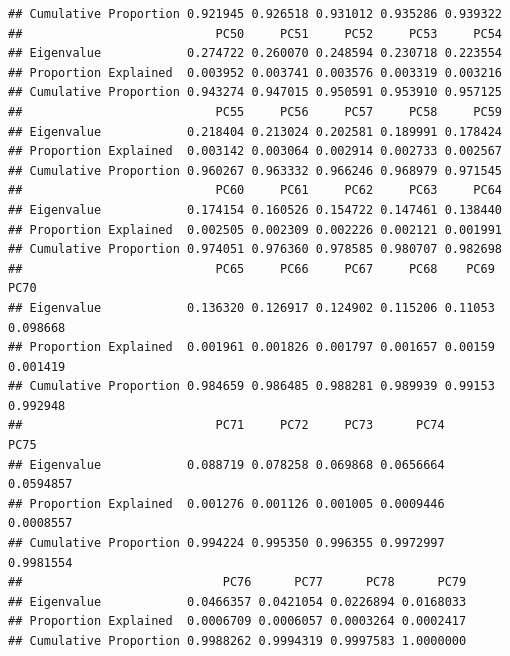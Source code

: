 \documentclass[]{article}
\newenvironment{Shaded}{\begin{snugshade}}{\end{snugshade}}
\newcommand{\CommentTok}[1]{\textcolor[rgb]{0.56,0.35,0.01}{\textit{#1}}}
\newcommand{\DataTypeTok}[1]{\textcolor[rgb]{0.13,0.29,0.53}{#1}}
\newcommand{\KeywordTok}[1]{\textcolor[rgb]{0.13,0.29,0.53}{\textbf{#1}}}
\newcommand{\NormalTok}[1]{#1}
\newcommand{\OperatorTok}[1]{\textcolor[rgb]{0.81,0.36,0.00}{\textbf{#1}}}
\newcommand{\StringTok}[1]{\textcolor[rgb]{0.31,0.60,0.02}{#1}}
\begin{document}
\begin{verbatim}
## Cumulative Proportion 0.921945 0.926518 0.931012 0.935286 0.939322
##                           PC50     PC51     PC52     PC53     PC54
## Eigenvalue            0.274722 0.260070 0.248594 0.230718 0.223554
## Proportion Explained  0.003952 0.003741 0.003576 0.003319 0.003216
## Cumulative Proportion 0.943274 0.947015 0.950591 0.953910 0.957125
##                           PC55     PC56     PC57     PC58     PC59
## Eigenvalue            0.218404 0.213024 0.202581 0.189991 0.178424
## Proportion Explained  0.003142 0.003064 0.002914 0.002733 0.002567
## Cumulative Proportion 0.960267 0.963332 0.966246 0.968979 0.971545
##                           PC60     PC61     PC62     PC63     PC64
## Eigenvalue            0.174154 0.160526 0.154722 0.147461 0.138440
## Proportion Explained  0.002505 0.002309 0.002226 0.002121 0.001991
## Cumulative Proportion 0.974051 0.976360 0.978585 0.980707 0.982698
##                           PC65     PC66     PC67     PC68    PC69     PC70
## Eigenvalue            0.136320 0.126917 0.124902 0.115206 0.11053 0.098668
## Proportion Explained  0.001961 0.001826 0.001797 0.001657 0.00159 0.001419
## Cumulative Proportion 0.984659 0.986485 0.988281 0.989939 0.99153 0.992948
##                           PC71     PC72     PC73      PC74      PC75
## Eigenvalue            0.088719 0.078258 0.069868 0.0656664 0.0594857
## Proportion Explained  0.001276 0.001126 0.001005 0.0009446 0.0008557
## Cumulative Proportion 0.994224 0.995350 0.996355 0.9972997 0.9981554
##                            PC76      PC77      PC78      PC79
## Eigenvalue            0.0466357 0.0421054 0.0226894 0.0168033
## Proportion Explained  0.0006709 0.0006057 0.0003264 0.0002417
## Cumulative Proportion 0.9988262 0.9994319 0.9997583 1.0000000
\end{verbatim}

\begin{Shaded}
\end{Shaded}
\end{document}
